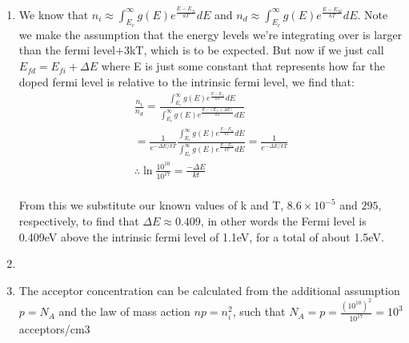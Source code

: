 \documentclass{article}
\begin{document}
\begin{prob}
	\begin{enumerate}
		\item We know that $n_i\approx\int_{E_c}^{\infty}g(E)e^{\frac{E-E_{fi}}{kT}}dE$ and $n_d\approx\int_{E_c}^{\infty}g(E)e^{\frac{E-E_{fd}}{kT}}dE$. Note we make the assumption that the  energy levels we're integrating over is larger than the fermi level+3kT, which is to be expected. But now if we just call $E_{fd}=E_{fi}+\Delta E$ where E is just some constant that represents how far the doped fermi level is relative to the intrinsic fermi level, we find that:  
	\[\begin{split} 
		\frac{n_i}{n_d}=\frac{\int_{E_c}^{\infty}g(E)e^{\frac{E-E_{fi}}{kT}}dE}{\int_{E_c}^{\infty}g(E)e^{\frac{E-(E_{fi}+\Delta E)}{kT}}dE} \\
    =\frac{1}{e^{- \Delta E/kT}}\frac{\int_{E_c}^{\infty}g(E)e^{\frac{E-E_{fi}}{kT}}dE}{\int_{E_c}^{\infty}g(E)e^{\frac{E-E_{fi}}{kT}}dE}=\frac{1}{e^{-\Delta E/kT}} \\
 \therefore \ln{\frac{10^{10}}{10^{17}}} = \frac{-\Delta E}{kt} \\
	\end{split} 
 \]

From this we substitute our known values of k and T, $8.6\times10^{-5}$ and $295$, respectively, to find that $\Delta E\approx0.409$, in other words the Fermi level is 0.409eV above the intrinsic fermi level of 1.1eV, for a total of about 1.5eV. 

        \item {}

        \item The acceptor concentration can be calculated from the additional assumption $p=N_A$ and the law of mass action $np=n_i^2$, such that $N_A=p=\frac{(10^{10})^2}{10^{17}}=10^3$ acceptors/cm3
    \end{enumerate}
\end{prob}
\end{document}
